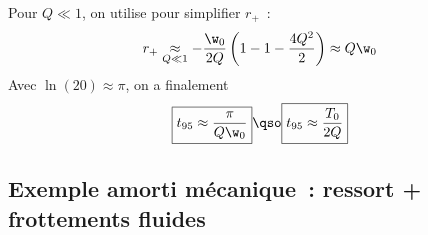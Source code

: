 \documentclass[../../main/main.tex]{subfiles}
\begin{document}
\begin{tcbraster}[raster columns=2, raster equal height=rows]
\begin{tcb}[label=demo:transiaper]
		Pour $Q \ll 1$, on utilise  pour simplifier $r_+$~:
		\begin{gather*}
			r_+ \underset{Q\ll1}{\approx} - \frac{\w_0}{2Q} \left( 1 - 1 -
			\frac{4Q^2}{2} \right) \approx Q\w_0
		\end{gather*}
		Avec $\ln(20) \approx \pi$, on a finalement
		\begin{equation*}
			\boxed{t_{95} \approx \frac{\pi}{Q\w_0}} \qso \boxed{t_{95} \approx
				\frac{T_0}{2Q}}
		\end{equation*}
	\end{tcb}
\end{tcbraster}

\vspace{-15pt}
\subsection{Exemple amorti mécanique~: ressort + frottements fluides}
\end{document}
